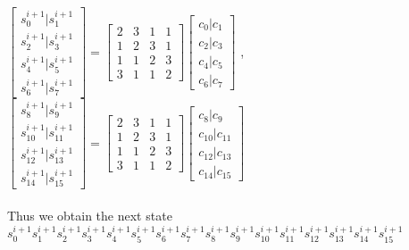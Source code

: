 \begin{frame}
	$\begin{bmatrix}
	s^{i+1}_{0} | s^{i+1}_{1}\\
	s^{i+1}_{2} | s^{i+1}_{3}\\
	s^{i+1}_{4} | s^{i+1}_{5}\\
	s^{i+1}_{6} | s^{i+1}_{7}
	\end{bmatrix}=
	\begin{bmatrix}
	2&3&1&1\\
	1&2&3&1\\
	1&1&2&3\\
	3&1&1&2
	\end{bmatrix}
	\begin{bmatrix}
	c_{0}|c_{1}\\
	c_{2}|c_{3}\\
	c_{4}|c_{5}\\
	c_{6}|c_{7}
	\end{bmatrix}  $ ,
	$\begin{bmatrix}
	s^{i+1}_{8} | s^{i+1}_{9}\\
	s^{i+1}_{10} | s^{i+1}_{11}\\
	s^{i+1}_{12} | s^{i+1}_{13}\\
	s^{i+1}_{14} | s^{i+1}_{15}
	\end{bmatrix}=
	\begin{bmatrix}
	2&3&1&1\\
	1&2&3&1\\
	1&1&2&3\\
	3&1&1&2
	\end{bmatrix}
	\begin{bmatrix}
	c_{8}|c_{9}\\
	c_{10}|c_{11}\\
	c_{12}|c_{13}\\
	c_{14}|c_{15}
	\end{bmatrix}  $\\ \\
	Thus we obtain the next state 
	$ s^{i+1}_{0}  s^{i+1}_{1}
	s^{i+1}_{2}  s^{i+1}_{3}
	s^{i+1}_{4}  s^{i+1}_{5}
	s^{i+1}_{6}  s^{i+1}_{7}
	s^{i+1}_{8}  s^{i+1}_{9}
	s^{i+1}_{10}  s^{i+1}_{11}
	s^{i+1}_{12}  s^{i+1}_{13}
	s^{i+1}_{14}  s^{i+1}_{15} $
\end{frame}
	
